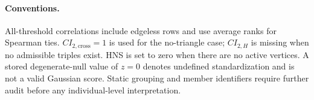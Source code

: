 \documentclass[a4paper,fleqn,oneside]{cas-sc}
\theoremstyle{definition}
\theoremstyle{plain}
\begin{document}
\paragraph{Conventions.}
All-threshold correlations include edgeless rows and use average ranks for Spearman ties. $CI_{2,\mathrm{cross}}=1$ is used for the no-triangle case; $CI_{2,H}$ is missing when no admissible triples exist. HNS is set to zero when there are no active vertices. A stored degenerate-null value of $z=0$ denotes undefined standardization and is not a valid Gaussian score. Static grouping and member identifiers require further audit before any individual-level interpretation.

\par\medskip
\printcredits


\end{document}
